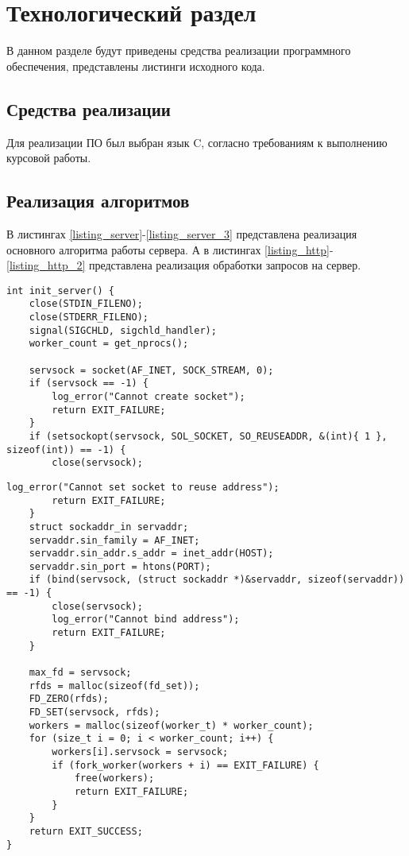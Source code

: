 \chapter{Технологический раздел}

В данном разделе будут приведены средства реализации программного обеспечения, представлены листинги исходного кода.

\section{Средства реализации}

Для реализации ПО был выбран язык C, согласно требованиям к выполнению курсовой работы.

\section{Реализация алгоритмов}
В листингах \ref{listing_server}-\ref{listing_server_3} представлена реализация основного алгоритма работы сервера. 
А в листингах \ref{listing_http}-\ref{listing_http_2} представлена реализация обработки запросов на сервер.

	\begin{lstlisting}[caption=Основной алгоритм работы сервера]
int init_server() {
	close(STDIN_FILENO);
	close(STDERR_FILENO);
	signal(SIGCHLD, sigchld_handler);
	worker_count = get_nprocs();
	
	servsock = socket(AF_INET, SOCK_STREAM, 0);
	if (servsock == -1) {
		log_error("Cannot create socket");
		return EXIT_FAILURE;
	}
	if (setsockopt(servsock, SOL_SOCKET, SO_REUSEADDR, &(int){ 1 }, sizeof(int)) == -1) {
		close(servsock);
	\end{lstlisting}
	
	\begin{lstlisting}[caption=Основной алгоритм работы сервера (продолжение)]
		log_error("Cannot set socket to reuse address");
		return EXIT_FAILURE;
	}
	struct sockaddr_in servaddr;
	servaddr.sin_family = AF_INET;
	servaddr.sin_addr.s_addr = inet_addr(HOST);
	servaddr.sin_port = htons(PORT);
	if (bind(servsock, (struct sockaddr *)&servaddr, sizeof(servaddr)) == -1) {
		close(servsock);
		log_error("Cannot bind address");
		return EXIT_FAILURE;
	}
	
	max_fd = servsock;
	rfds = malloc(sizeof(fd_set));
	FD_ZERO(rfds);
	FD_SET(servsock, rfds);
	workers = malloc(sizeof(worker_t) * worker_count);
	for (size_t i = 0; i < worker_count; i++) {
		workers[i].servsock = servsock;
		if (fork_worker(workers + i) == EXIT_FAILURE) {
			free(workers);
			return EXIT_FAILURE;
		}
	}
	return EXIT_SUCCESS;
}
	\end{lstlisting}

